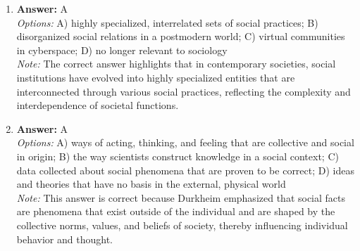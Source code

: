 \documentclass[12pt]{article}
\begin{document}
\begin{enumerate}[label=\arabic*.]
\item \textbf{Answer:} A
\\ \textit{Options:} A) highly specialized, interrelated sets of social practices; B) disorganized social relations in a postmodern world; C) virtual communities in cyberspace; D) no longer relevant to sociology
\\ \textit{Note:} The correct answer highlights that in contemporary societies, social institutions have evolved into highly specialized entities that are interconnected through various social practices, reflecting the complexity and interdependence of societal functions.
\item \textbf{Answer:} A
\\ \textit{Options:} A) ways of acting, thinking, and feeling that are collective and social in origin; B) the way scientists construct knowledge in a social context; C) data collected about social phenomena that are proven to be correct; D) ideas and theories that have no basis in the external, physical world
\\ \textit{Note:} This answer is correct because Durkheim emphasized that social facts are phenomena that exist outside of the individual and are shaped by the collective norms, values, and beliefs of society, thereby influencing individual behavior and thought.
\end{enumerate}
\end{document}
